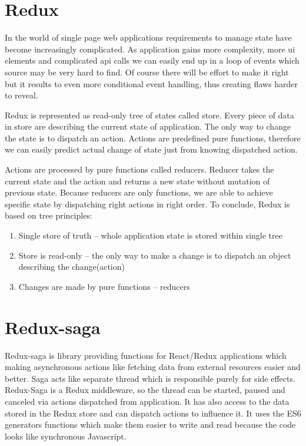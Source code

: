 \section{Redux}
In the world of single page web applications requirements to manage state have become increasingly complicated. As application gains more complexity, more ui elements and complicated api calls we can easily end up in a loop of events which source may be very hard to find. Of course there will be effort to make it right but it results to even more conditional event handling, thus creating flaws harder to reveal.

Redux is represented as read-only tree of states called store. Every piece of data in store are describing the current state of application. The only way to change the state is to dispatch an action. Actions are predefined pure functions, therefore we can easily predict actual change of state just from knowing dispatched action.

Actions are processed by pure functions called reducers. Reducer takes the current state and the action and returns a new state without mutation of previous state. Because reducers are only functions, we are able to achieve specific state by dispatching right actions in right order. To conclude, Redux is based on tree principles\cite{treePrinciples}:
\begin{enumerate}
\item Single store of truth -- whole application state is stored within single tree
\item Store is read-only -- the only way to make a change is to dispatch an object describing the change(action)
\item Changes are made by pure functions -- reducers 
\end{enumerate}

\section{Redux-saga}
Redux-saga\cite{redux-saga} is library providing functions for React/Redux applications which making asynchronous actions like fetching data from external resources easier and better. Saga acts like separate thread which is responsible purely for side effects. Redux-Saga is a Redux middleware, so the thread can be started, paused and canceled via actions dispatched from application. It has also access to the data stored in the Redux store and can dispatch actions to influence it. It uses the ES6 generators functions which make them easier to write and read because the code looks like synchronous Javascript.

